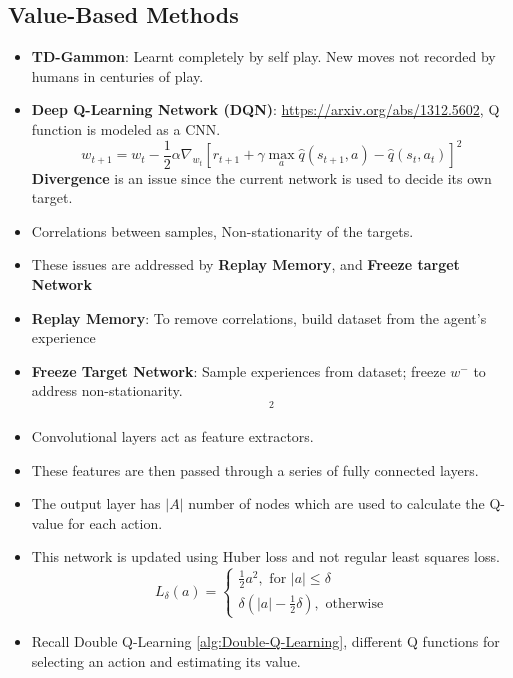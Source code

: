 \documentclass[a4paper]{article}
\begin{document}
\subsection{Value-Based Methods}
\begin{itemize}
    \item \textbf{TD-Gammon}: Learnt completely by self play. New moves not recorded by humans in centuries of play.
    \item \textbf{Deep Q-Learning Network (DQN)}: \url{https://arxiv.org/abs/1312.5602}, Q function is modeled as a CNN.
    \begin{equation*}
        w_{t+1}=w_t-\frac{1}{2}\alpha \nabla_{w_t}[r_{t+1}+\gamma \max_a\hat{q}(s_{t+1},a)-\hat{q}(s_t,a_t)]^2
    \end{equation*}
    \textbf{Divergence} is an issue since the current network is used to decide its own target.
    \item Correlations between samples, Non-stationarity of the targets.
    \item These issues are addressed by \textbf{Replay Memory}, and \textbf{Freeze target Network}
    \item \textbf{Replay Memory}: To remove correlations, build dataset from the agent's experience
    \item \textbf{Freeze Target Network}: Sample experiences from dataset; freeze $w^-$ to address non-stationarity.
    \begin{equation*}
        [r_{t+1}+\gamma \max_a\hat{q}(s_{t+1},a;w^-)-\hat{q}(s_t,a_t;w)]^2
    \end{equation*}
    \item Convolutional layers act as feature extractors.
    \item These features are then passed through a series of fully connected layers.
    \item The output layer has $|A|$ number of nodes which are used to calculate the Q-value for each action.
    \item This network is updated using Huber loss and not regular least squares loss.
    \begin{equation*}
        L_{\delta}(a)=\begin{cases}
            \frac{1}{2}a^2,\text{ for }|a|\leq \delta \\
            \delta(|a|-\frac{1}{2}\delta),\text{ otherwise}
        \end{cases}
    \end{equation*}
    \item Recall Double Q-Learning \ref{alg:Double-Q-Learning}, different Q functions for selecting an action and estimating its value.

\end{itemize}
\end{document}
